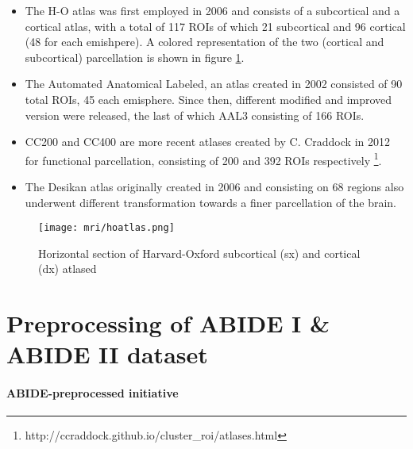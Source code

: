 \documentclass[11pt]{report}
\begin{document}
\begin{itemize}

\item The H-O atlas was first employed in 2006 \cite{makris2006} and consists of a subcortical and a cortical atlas, with a total of 117 ROIs of which 21 subcortical and 96 cortical (48 for each emishpere). A colored representation of the two (cortical and subcortical) parcellation is shown in figure \ref{fig:hoatlas}.

\item The Automated Anatomical Labeled, an atlas created in 2002 \cite{mazoyer-2002} consisted of 90 total ROIs, 45 each emisphere. Since then, different modified and improved version were released, the last of which AAL3 consisting of 166 ROIs.

\item CC200 and CC400 are more recent atlases created by C. Craddock in 2012 \cite{craddock2012} for functional parcellation, consisting of 200 and 392 ROIs respectively \footnote{http://ccraddock.github.io/cluster\_roi/atlases.html}.

\item The Desikan atlas \cite{desikan2006} originally created in 2006 and consisting on 68 regions also underwent different transformation towards a finer parcellation of the brain.

\end{itemize}


\begin{figure}[h]
\centering
\texttt{[image: mri/hoatlas.png]}
\caption{Horizontal section of Harvard-Oxford subcortical (sx) and cortical (dx) atlased}
\label{fig:hoatlas}
\end{figure}




\section{Preprocessing of ABIDE I \& ABIDE II dataset}\label{sec:cpac}

\paragraph{ABIDE-preprocessed initiative}\hfill
\end{document}
